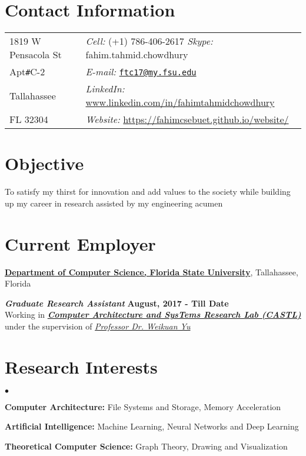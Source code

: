 \documentclass[margin,line]{res}
\newenvironment{list2}{
  \begin{list}{$\bullet$}{%
      \setlength{\itemsep}{0in}
      \setlength{\parsep}{0in} \setlength{\parskip}{0in}
      \setlength{\topsep}{0in} \setlength{\partopsep}{0in} 
      \setlength{\leftmargin}{0.2in}}}{\end{list}}
\begin{document}

\begin{resume}

\section{\sc Contact Information}
\begin{tabular}{@{}p{2in}p{4in}}
1819 W Pensacola St & {\it Cell:}  (+1) 786-406-2617 {\it Skype:}    fahim.tahmid.chowdhury\\            
Apt\texttt{\#}C-2 & {\it E-mail:} \href{mailto:ftc17@my.fsu.edu}{\nolinkurl{ftc17@my.fsu.edu} } \\
Tallahassee & {\it LinkedIn:} \url{www.linkedin.com/in/fahimtahmidchowdhury} \\
FL 32304 & {\it Website:} \url{https://fahimcsebuet.github.io/website/} \\
\end{tabular}

\vspace*{-.1in}

\section{\sc Objective}
To satisfy my thirst for innovation and add values to the society while building up my career in research assisted by my engineering acumen

\vspace*{-.1in}

\section{\sc Current Employer}
{\bf \href{http://www.cs.fsu.edu/}{Department of Computer Science, Florida State University}}, Tallahassee, Florida

\vspace{-.4cm}
\textbf{{\em Graduate Research Assistant}} \hfill {\bf August, 2017 - Till Date}\\
Working in \textbf{\textit{\href{http://castl.cs.fsu.edu/doku.php/}{Computer Architecture and SysTems Research Lab (CASTL)}}} under the supervision of \textit{\href{https://www.cs.fsu.edu/~yuw/}{Professor Dr. Weikuan Yu}}

\vspace*{-.1in}

\section{\sc Research Interests}
\begin{list2}
\item \textbf{Computer Architecture:} File Systems and Storage, Memory Acceleration
\item \textbf{Artificial Intelligence:} Machine Learning, Neural Networks and Deep Learning
\item \textbf{Theoretical Computer Science:} Graph Theory, Drawing and Visualization
\end{list2}


\end{resume}
\end{document}
